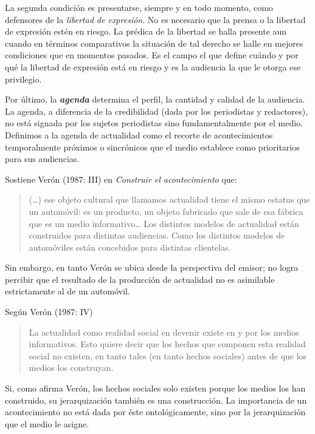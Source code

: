 La segunda condición es presentarse, siempre y en todo momento, como defensores de la \emph{libertad de expresión}. No es necesario que la prensa o la libertad de expresión estén en riesgo. La prédica de la libertad se halla presente aun cuando en términos comparativos la situación de tal derecho se halle en mejores condiciones que en momentos pasados. Es el campo el que define cuándo y por qué la libertad de expresión está en riesgo y es la audiencia la que le otorga ese privilegio.

Por último, la \emph{\textbf{agenda}} determina el perfil, la cantidad y calidad de la audiencia. La agenda, a diferencia de la credibilidad (dada por los periodistas y redactores), no está signada por los sujetos periodistas sino fundamentalmente por el medio. Definimos a la agenda de actualidad como el recorte de acontecimientos temporalmente próximos o sincrónicos que el medio establece como prioritarios para sus audiencias.

Sostiene Verón (1987: III) en \emph{Construir el acontecimiento} que:

\begin{quote}
(\ldots) ese objeto cultural que llamamos actualidad  tiene el mismo estatus que un automóvil: es un producto, un objeto fabricado que sale de esa fábrica que es un medio informativo\ldots{} Los distintos modelos de actualidad están construidos para distintas audiencias. Como los distintos modelos de automóviles están concebidos para distintas clientelas.
\end{quote}

Sin embargo, en tanto Verón se ubica desde la perspectiva del emisor; no logra percibir que el resultado de la producción de actualidad no es asimilable estrictamente al de un automóvil.

Según Verón (1987: IV)

\begin{quote}
La actualidad como realidad social en devenir existe en y por los medios informativos. Esto quiere decir que los hechos que componen esta realidad social no existen, en tanto tales (en tanto hechos sociales) antes de que los medios los construyan.
\end{quote}

Si, como afirma Verón, los hechos sociales solo existen porque los medios los han construido, su jerarquización también es una construcción. La importancia de un acontecimiento no está dada por éste ontológicamente, sino por la jerarquización que el medio le asigne.

